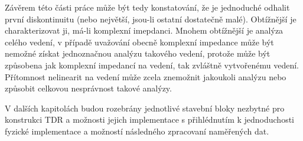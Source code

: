 Závěrem této části práce může být tedy konstatování, že je jednoduché odhalit první diskontinuitu (nebo největší, jsou-li ostatní dostatečně malé). Obtížnější je charakterizovat ji, má-li komplexní imepdanci. Mnohem obtížnější je analýza celého vedení, v případě uvažování obecně komplexní impedance může být nemožné získat jednoznačnou analýzu takového vedení, protože může být způsobena jak komplexní impedancí na vedení, tak zvláštně vytvořenému vedení. Přítomnost nelinearit na vedení může zcela znemožnit jakoukoli analýzu nebo způsobit celkovou nesprávnost takové analýzy.

V dalších kapitolách budou rozebrány jednotlivé stavební bloky nezbytné pro konstrukci \acrshort{TDR} a možnosti jejich implementace s přihlédnutím k jednoduchosti fyzické implementace a možností následného zpracovaní naměřených dat.